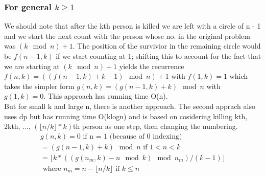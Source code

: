 \documentclass[8pt, a4paper, oneside, twocolumn]{extarticle}
\begin{document}
\subsubsection{For general $k \geq 1$}
We should note that after the kth person is killed we are left with a circle of n - 1 and we start the next count with the person whose no. in the original problem was $(k \mod n) + 1$. The position of the survivior in the remaining circle would be $f(n - 1, k)$ if we start counting at 1; shifting this to account for the fact that we are starting at $(k \mod n) + 1$ yields the recurrence $f(n, k) =  ((f(n - 1, k) + k - 1) \mod n) + 1$ with $f(1, k) = 1$ which takes the simpler form $g(n, k) = (g(n - 1, k) + k) \mod n$ with $g(1, k) = 0$. This approach has running time O(n).
\\But for small k and large n, there is another approach. The second apprach also uses dp but has running time O(klogn) and is based on cosidering killing kth, 2kth, ..., $(\lfloor n/k \rfloor * k)$th person as one step, then changing the numbering.
\begin{eqnarray}
g(n, k) = 0 \text{ if n = 1 (because of 0 indexing)}\\
        = (g(n - 1, k) + k) \mod n \text{ if $1 < n < k$}\\
        = \lfloor k * ((g(n_m, k) - n \mod k) \mod n_m) / (k - 1) \rfloor\\ \text{ where $n_m = n - \lfloor n/k \rfloor$ if $k \leq n$}
\end{eqnarray}
\end{document}
